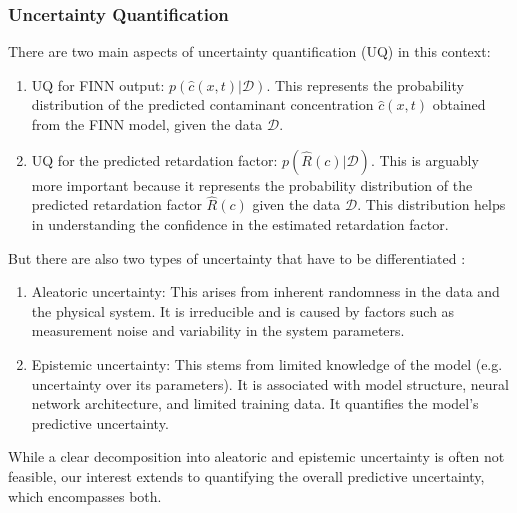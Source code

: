 \documentclass{article}
\begin{document}
\subsubsection{Uncertainty Quantification}
There are two main aspects of uncertainty quantification (UQ) in this context:
\begin{enumerate}
    \item UQ for FINN output: $p(\hat{c}(x,t) | \mathcal{D})$. This represents the probability distribution of the predicted contaminant concentration $\hat{c}(x,t)$ obtained from the FINN model, given the data $\mathcal{D}$.
    \item UQ for the predicted retardation factor: $p(\hat{R}(c) | \mathcal{D})$. This is arguably more important because it represents the probability distribution of the predicted retardation factor $\hat{R}(c)$ given the data $\mathcal{D}$. This distribution helps in understanding the confidence in the estimated retardation factor.
\end{enumerate}

But there are also two types of uncertainty that have to be differentiated \parencite{depeweg2018decomposition, gawlikowski2023survey}:

\begin{enumerate}
    \item Aleatoric uncertainty: This arises from inherent randomness in the data and the physical system. It is irreducible and is caused by factors such as measurement noise and variability in the system parameters.
    \item Epistemic uncertainty: This stems from limited knowledge of the model (e.g. uncertainty over its parameters). It is associated with model structure, neural network architecture, and limited training data. It quantifies the model's predictive uncertainty.
\end{enumerate}

While a clear decomposition into aleatoric and epistemic uncertainty is often not feasible, our interest extends to quantifying the overall predictive uncertainty, which encompasses both.
\end{document}
